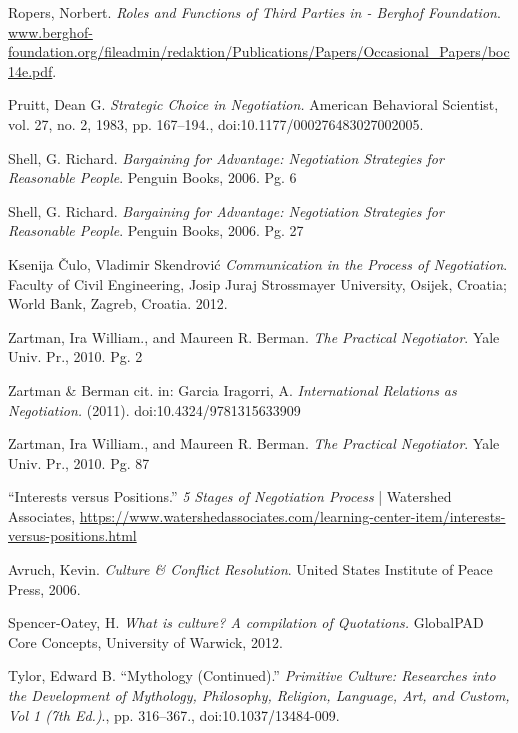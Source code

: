 \documentclass[../main.tex]{subfiles}
\begin{document}
\begin{thebibliography}{9}
\raggedright


 Ropers, Norbert. \textit{Roles and Functions of Third Parties in - Berghof Foundation}.
\url{www.berghof-foundation.org/fileadmin/redaktion/Publications/Papers/Occasional\_Papers/boc14e.pdf}.

 Pruitt, Dean G. \textit{Strategic Choice in Negotiation.} American Behavioral Scientist, vol. 27, no. 2, 1983, pp. 167–194., doi:10.1177/000276483027002005.

 Shell, G. Richard. \textit{Bargaining for Advantage: Negotiation Strategies for Reasonable People}. Penguin Books, 2006. Pg. 6

 Shell, G. Richard. \textit{Bargaining for Advantage: Negotiation Strategies for Reasonable People}. Penguin Books, 2006. Pg. 27

 Ksenija Čulo, Vladimir Skendrović \textit{Communication in the Process of Negotiation}. Faculty of Civil Engineering, Josip Juraj Strossmayer University, Osijek, Croatia; World Bank, Zagreb, Croatia. 2012.

 Zartman, Ira William., and Maureen R. Berman. \textit{The Practical Negotiator}. Yale Univ. Pr., 2010. Pg. 2

 Zartman \& Berman cit. in: Garcia Iragorri, A. \textit{International Relations as Negotiation.} (2011).  doi:10.4324/9781315633909

  Zartman, Ira William., and Maureen R. Berman. \textit{The Practical Negotiator}. Yale Univ. Pr., 2010. Pg. 87

 “Interests versus Positions.” \textit{5 Stages of Negotiation Process} | Watershed Associates, \url{https://www.watershedassociates.com/learning-center-item/interests-versus-positions.html}

 Avruch, Kevin. \textit{Culture \& Conflict Resolution}. United States Institute of Peace Press, 2006.

 Spencer-Oatey, H. \textit{What is culture? A compilation of Quotations.} GlobalPAD Core Concepts, University of Warwick, 2012.

 Tylor, Edward B. “Mythology (Continued).” \textit{Primitive Culture: Researches into the Development of Mythology, Philosophy, Religion, Language, Art, and Custom, Vol 1 (7th Ed.)}., pp. 316–367., doi:10.1037/13484-009.


\end{thebibliography}
\end{document}
